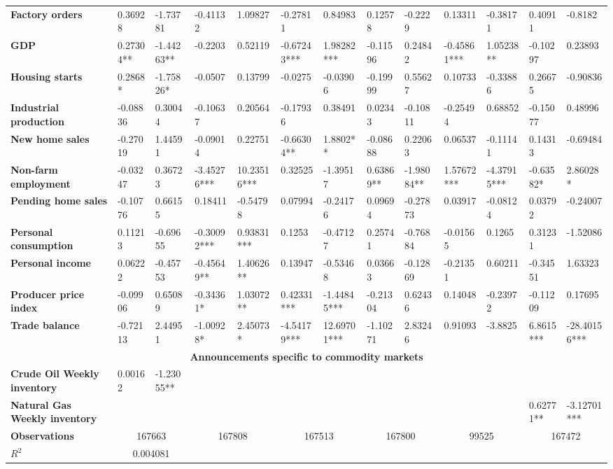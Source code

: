 \begin{sidewaystable}
{\begin{tabular}{@{}lllllllllllll@{}}
\textbf{Factory orders}& 0.36928 & -1.73781 & -0.41132 & 1.09827 & -0.27811 & 0.84983 & 0.12578 & -0.2229 & 0.13311 & -0.38171 & 0.40911 & -0.8182 \\ \textbf{GDP}& 0.27304**& -1.44263**& -0.2203 & 0.52119 & -0.67243*** & 1.98282*** & -0.11596 & 0.24842 & -0.45861*** & 1.05238** & -0.10297 & 0.23893 \\ \textbf{Housing starts}& 0.2868*& -1.75826*& -0.0507 & 0.13799 & -0.0275 & -0.03906 & -0.19999 & 0.55627 & 0.10733 & -0.33886 & 0.26675 & -0.90836 \\ \textbf{Industrial production}& -0.08836 & 0.30044 & -0.10637 & 0.20564 & -0.17936 & 0.38491 & 0.02343 & -0.10811 & -0.25494 & 0.68852 & -0.15077 & 0.48996 \\ \textbf{New home sales}& -0.27019 & 1.44591 & -0.09014 & 0.22751 & -0.66304** & 1.8802** & -0.08688 & 0.22063 & 0.06537 & -0.11141 & 0.14313 & -0.69484 \\ \textbf{Non-farm employment}& -0.03247 & 0.36723 & -3.45276***& 10.23516***& 0.32525 & -1.39517 & 0.63869** & -1.98084** & 1.57672*** & -4.37915*** & -0.63582* & 2.86028* \\ \textbf{Pending home sales}& -0.10776 & 0.66155 & 0.18411 & -0.54798 & 0.07994 & -0.24176 & 0.09694 & -0.27873 & 0.03917 & -0.08124 & 0.03792 & -0.24007 \\ \textbf{Personal consumption}& 0.11213 & -0.69655 & -0.30092***& 0.93831***& 0.1253 & -0.47127 & 0.25741 & -0.76884 & -0.01565 & 0.1265 & 0.31231 & -1.52086 \\ \textbf{Personal income}& 0.06222 & -0.45753 & -0.45649**& 1.40626**& 0.13947 & -0.53468 & 0.03663 & -0.12869 & -0.21351 & 0.60211 & -0.34551 & 1.63323 \\ \textbf{Producer price index}& -0.09906 & 0.65089 & -0.34361*& 1.03072**& 0.42331*** & -1.44845*** & -0.21304 & 0.62436 & 0.14048 & -0.23972 & -0.11209 & 0.17695 \\ \textbf{Trade balance}& -0.72113 & 2.44951 & -1.00928* & 2.45073* & -4.54179*** & 12.69701*** & -1.10271 & 2.83246 & 0.91093 & -3.8825 & 6.8615*** & -28.40156*** \\  \midrule \multicolumn{13}{c}{\textbf{Announcements specific to commodity markets}} \\ \midrule \textbf{Crude Oil Weekly inventory}& 0.00162 & -1.23055** &  &  &  &  &  &  &  &  &  &  \\ \textbf{Natural Gas Weekly inventory}&  &  &  &  &  &  &  &  &  &  & 0.62771** & -3.12701*** \\  \midrule \textbf{Observations}             &\multicolumn{2}{c}{ 167663 }                                                 & \multicolumn{2}{c}{ 167808 }                                                 & \multicolumn{2}{c}{ 167513 }                                                 & \multicolumn{2}{c}{ 167800 }                                                 & \multicolumn{2}{c}{ 99525 }                                                   & \multicolumn{2}{c}{ 167472 }                                                 \\ \textbf{$R^2$}             &\multicolumn{2}{c}{ 0.004081 }                                                 & 
\end{tabular}}
\end{sidewaystable}
